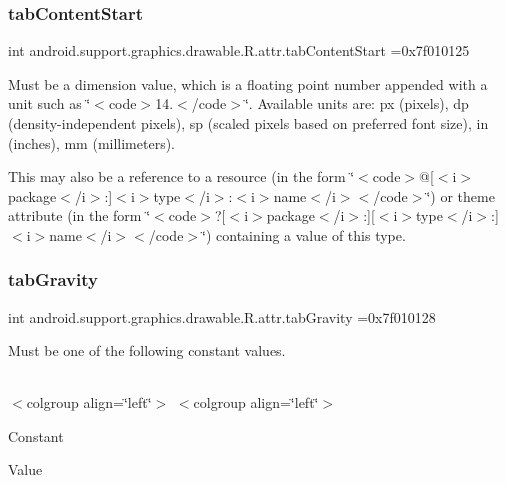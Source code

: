\subsubsection{\texorpdfstring{tab\+Content\+Start}{tabContentStart}}
{\footnotesize\ttfamily int android.\+support.\+graphics.\+drawable.\+R.\+attr.\+tab\+Content\+Start =0x7f010125\hspace{0.3cm}{\ttfamily [static]}}

Must be a dimension value, which is a floating point number appended with a unit such as \char`\"{}$<$code$>$14.\+5sp$<$/code$>$\char`\"{}. Available units are\+: px (pixels), dp (density-\/independent pixels), sp (scaled pixels based on preferred font size), in (inches), mm (millimeters). 

This may also be a reference to a resource (in the form \char`\"{}$<$code$>$@\mbox{[}$<$i$>$package$<$/i$>$\+:\mbox{]}$<$i$>$type$<$/i$>$\+:$<$i$>$name$<$/i$>$$<$/code$>$\char`\"{}) or theme attribute (in the form \char`\"{}$<$code$>$?\mbox{[}$<$i$>$package$<$/i$>$\+:\mbox{]}\mbox{[}$<$i$>$type$<$/i$>$\+:\mbox{]}$<$i$>$name$<$/i$>$$<$/code$>$\char`\"{}) containing a value of this type. \mbox{\label{classandroid_1_1support_1_1graphics_1_1drawable_1_1R_1_1attr_a7a3efaf74af3ebb75df29a9974ce9cd5}} 
\subsubsection{\texorpdfstring{tab\+Gravity}{tabGravity}}
{\footnotesize\ttfamily int android.\+support.\+graphics.\+drawable.\+R.\+attr.\+tab\+Gravity =0x7f010128\hspace{0.3cm}{\ttfamily [static]}}

Must be one of the following constant values.

\tabulinesep=1mm
\begin{longtabu} spread 0pt [c]{*{0}{|X[-1]}|}
\hline
\end{longtabu}
$<$colgroup align=\char`\"{}left\char`\"{}$>$ $<$colgroup align=\char`\"{}left\char`\"{}$>$ 

Constant

Value


